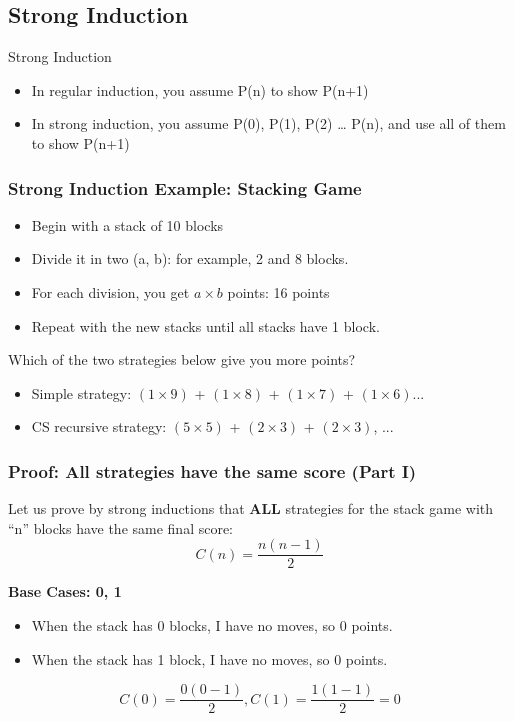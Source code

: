\subsection{Strong Induction}

\begin{frame}[t]{Strong Induction}

  {\larger
    \begin{itemize}
    \item In regular induction, you assume P(n) to show P(n+1)

      \bigskip

    \item In strong induction, you assume P(0), P(1), P(2) \ldots
      P(n), and use all of them to show P(n+1)
    \end{itemize}
  }
\end{frame}

\begin{frame}
  \frametitle{Strong Induction Example: Stacking Game}
  {\larger
  \begin{itemize}
  \item Begin with a stack of 10 blocks
  \item Divide it in two (a, b): for example, 2 and 8 blocks.
  \item For each division, you get $a\times b$ points: 16 points
  \item Repeat with the new stacks until all stacks have 1 block.
  \end{itemize}

  \bigskip

  \alert{Which of the two strategies below give you more points?}
  \begin{itemize}
  \item Simple strategy: $(1 \times 9)$ + $(1 \times 8)$ + $(1 \times 7)$ + $(1 \times 6)$... 
  \item CS recursive strategy: $(5 \times 5)$ + $(2 \times 3)$ + $(2 \times 3)$, ... 
  \end{itemize}
  }
\end{frame}

\begin{frame}
  \frametitle{Proof: All strategies have the same score (Part I)}

  {\larger
  Let us prove by strong inductions that {\bf ALL} strategies for the \alert{stack
  game with ``n'' blocks} have the same final score:
  \begin{equation*}
    C(n) = \frac{n(n-1)}{2}
  \end{equation*}

  \bigskip

  {\bf Base Cases: 0, 1}
  \begin{itemize}
  \item When the stack has 0 blocks, I have no moves, so 0 points.
  \item When the stack has 1 block, I have no moves, so 0 points.
  \end{itemize}
  \begin{equation*}
    C(0) = \frac{0(0-1)}{2}, C(1) = \frac{1(1-1)}{2} = 0
  \end{equation*}
  }
\end{frame}

